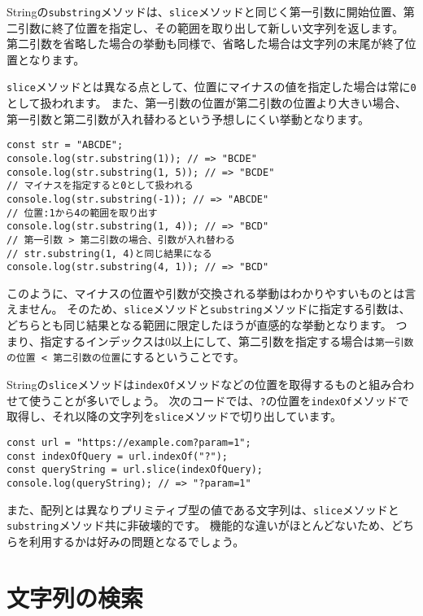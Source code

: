 Stringの\texttt{substring}メソッドは、\texttt{slice}メソッドと同じく第一引数に開始位置、第二引数に終了位置を指定し、その範囲を取り出して新しい文字列を返します。
第二引数を省略した場合の挙動も同様で、省略した場合は文字列の末尾が終了位置となります。

\texttt{slice}メソッドとは異なる点として、位置にマイナスの値を指定した場合は常に\texttt{0}として扱われます。
また、第一引数の位置が第二引数の位置より大きい場合、第一引数と第二引数が入れ替わるという予想しにくい挙動となります。

\begin{lstlisting}
const str = "ABCDE";
console.log(str.substring(1)); // => "BCDE"
console.log(str.substring(1, 5)); // => "BCDE"
// マイナスを指定すると0として扱われる
console.log(str.substring(-1)); // => "ABCDE"
// 位置:1から4の範囲を取り出す
console.log(str.substring(1, 4)); // => "BCD"
// 第一引数 > 第二引数の場合、引数が入れ替わる
// str.substring(1, 4)と同じ結果になる
console.log(str.substring(4, 1)); // => "BCD"
\end{lstlisting}

このように、マイナスの位置や引数が交換される挙動はわかりやすいものとは言えません。
そのため、\texttt{slice}メソッドと\texttt{substring}メソッドに指定する引数は、どちらとも同じ結果となる範囲に限定したほうが直感的な挙動となります。
つまり、指定するインデックスは0以上にして、第二引数を指定する場合は\texttt{第一引数の位置 < 第二引数の位置}にするということです。

Stringの\texttt{slice}メソッドは\texttt{indexOf}メソッドなどの位置を取得するものと組み合わせて使うことが多いでしょう。
次のコードでは、\texttt{?}の位置を\texttt{indexOf}メソッドで取得し、それ以降の文字列を\texttt{slice}メソッドで切り出しています。

\begin{lstlisting}
const url = "https://example.com?param=1";
const indexOfQuery = url.indexOf("?");
const queryString = url.slice(indexOfQuery);
console.log(queryString); // => "?param=1"
\end{lstlisting}

また、配列とは異なりプリミティブ型の値である文字列は、\texttt{slice}メソッドと\texttt{substring}メソッド共に非破壊的です。
機能的な違いがほとんどないため、どちらを利用するかは好みの問題となるでしょう。

\hypertarget{search}{%
\section{文字列の検索}\label{search}}

